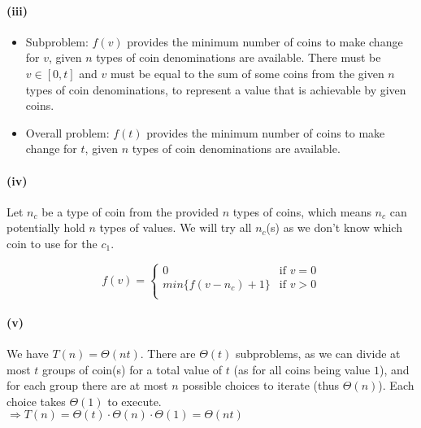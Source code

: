 \documentclass[11pt]{article}
\begin{document}
\paragraph{(iii)}

\begin{itemize}
    \item Subproblem: $f(v)$ provides the minimum number of coins to make change for $v$, given $n$ types of coin denominations are available. There must be  $v \in [0, t]$ and $v$ must be equal to the sum of some coins from the given $n$ types of coin denominations, to represent a value that is achievable by given coins.
    \item Overall problem: $f(t)$ provides the minimum number of coins to make change for $t$, given $n$ types of coin denominations are available.
\end{itemize}


\paragraph{(iv)}

Let $n_c$ be a type of coin from the provided $n$ types of coins, which means $n_c$ can potentially hold $n$ types of values. We will try all $n_c$(s) as we don't know which coin to use for the $c_1$.


\begin{equation}
    f(v) =
    \begin{cases}
        0 & \text{if \ } v = 0 \\
        min\{f(v - n_c) + 1\} & \text{if \ } v > 0 \\
    \end{cases}\nonumber
\end{equation}


\paragraph{(v)}

We have $T(n) = \Theta(nt)$. There are $\Theta(t)$ subproblems, as we can divide at most $t$ groups of coin(s) for a total value of $t$ (as for all coins being value $1$), and for each group there are at most $n$ possible choices to iterate (thus $\Theta(n)$). Each choice takes $\Theta(1)$ to execute. \\
$\Longrightarrow T(n) =  \Theta(t) \cdot \Theta(n) \cdot \Theta(1) =  \Theta(nt)$

\end{document}
